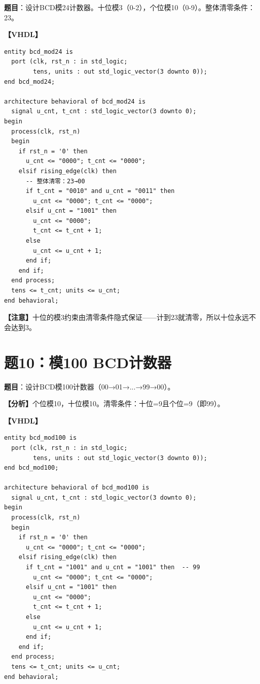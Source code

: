\textbf{题目}：设计BCD模24计数器。十位模3（0-2），个位模10（0-9）。整体清零条件：23。

\begin{solution}[完整解答]

\textbf{【VHDL】}
\begin{lstlisting}
entity bcd_mod24 is
  port (clk, rst_n : in std_logic;
        tens, units : out std_logic_vector(3 downto 0));
end bcd_mod24;

architecture behavioral of bcd_mod24 is
  signal u_cnt, t_cnt : std_logic_vector(3 downto 0);
begin
  process(clk, rst_n)
  begin
    if rst_n = '0' then
      u_cnt <= "0000"; t_cnt <= "0000";
    elsif rising_edge(clk) then
      -- 整体清零：23→00
      if t_cnt = "0010" and u_cnt = "0011" then
        u_cnt <= "0000"; t_cnt <= "0000";
      elsif u_cnt = "1001" then
        u_cnt <= "0000";
        t_cnt <= t_cnt + 1;
      else
        u_cnt <= u_cnt + 1;
      end if;
    end if;
  end process;
  tens <= t_cnt; units <= u_cnt;
end behavioral;
\end{lstlisting}

\textbf{【注意】}十位的模3约束由清零条件隐式保证——计到23就清零，所以十位永远不会达到3。

\end{solution}


\section{题10：模100 BCD计数器}

\textbf{题目}：设计BCD模100计数器（00→01→...→99→00）。

\begin{solution}[完整解答]

\textbf{【分析】}个位模10，十位模10。清零条件：十位=9且个位=9（即99）。

\textbf{【VHDL】}
\begin{lstlisting}
entity bcd_mod100 is
  port (clk, rst_n : in std_logic;
        tens, units : out std_logic_vector(3 downto 0));
end bcd_mod100;

architecture behavioral of bcd_mod100 is
  signal u_cnt, t_cnt : std_logic_vector(3 downto 0);
begin
  process(clk, rst_n)
  begin
    if rst_n = '0' then
      u_cnt <= "0000"; t_cnt <= "0000";
    elsif rising_edge(clk) then
      if t_cnt = "1001" and u_cnt = "1001" then  -- 99
        u_cnt <= "0000"; t_cnt <= "0000";
      elsif u_cnt = "1001" then
        u_cnt <= "0000";
        t_cnt <= t_cnt + 1;
      else
        u_cnt <= u_cnt + 1;
      end if;
    end if;
  end process;
  tens <= t_cnt; units <= u_cnt;
end behavioral;
\end{lstlisting}

\end{solution}


